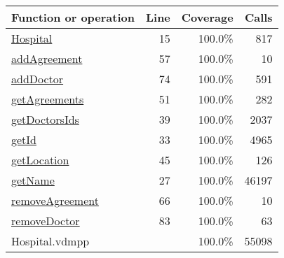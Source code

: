 \bigskip
\begin{longtable}{|l|r|r|r|}
\hline
Function or operation & Line & Coverage & Calls \\
\hline
\hline
\hyperref[Hospital:15]{Hospital} & 15&100.0\% & 817 \\
\hline
\hyperref[addAgreement:57]{addAgreement} & 57&100.0\% & 10 \\
\hline
\hyperref[addDoctor:74]{addDoctor} & 74&100.0\% & 591 \\
\hline
\hyperref[getAgreements:51]{getAgreements} & 51&100.0\% & 282 \\
\hline
\hyperref[getDoctorsIds:39]{getDoctorsIds} & 39&100.0\% & 2037 \\
\hline
\hyperref[getId:33]{getId} & 33&100.0\% & 4965 \\
\hline
\hyperref[getLocation:45]{getLocation} & 45&100.0\% & 126 \\
\hline
\hyperref[getName:27]{getName} & 27&100.0\% & 46197 \\
\hline
\hyperref[removeAgreement:66]{removeAgreement} & 66&100.0\% & 10 \\
\hline
\hyperref[removeDoctor:83]{removeDoctor} & 83&100.0\% & 63 \\
\hline
\hline
Hospital.vdmpp & & 100.0\% & 55098 \\
\hline
\end{longtable}

